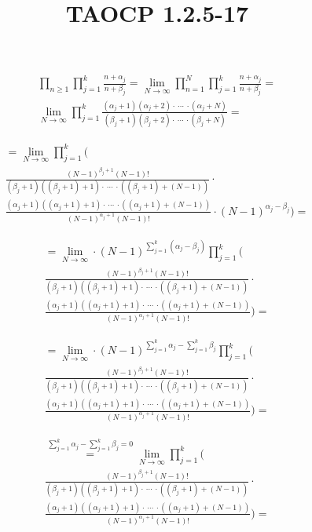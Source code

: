 \documentclass{article}
\title{TAOCP 1.2.5\mbox{-}17}
\begin{document}
\maketitle

\begin{multline*}
\prod_{n \geq 1}\prod_{j=1}^{k} \frac{n + \alpha_{j}}{n + \beta_{j}} = \lim_{N\to\infty}\prod_{n=1}^{N}\prod_{j=1}^{k} \frac{n + \alpha_{j}}{n + \beta_{j}} = \\
\lim_{N\to\infty}\prod_{j=1}^{k}\frac{(\alpha_{j} + 1)(\alpha_{j} + 2) \cdot\ \cdots\ \cdot (\alpha_{j} + N)}{(\beta_{j} + 1)(\beta_{j} + 2) \cdot\ \cdots\ \cdot (\beta_{j} + N)} =
\end{multline*}

\begin{multline*}
= \lim_{N\to\infty}\prod_{j=1}^{k}( \\
\frac{{(N-1)}^{\beta_{j}+1}(N-1)!}{(\beta_{j} + 1)((\beta_{j} + 1) + 1) \cdot\ \cdots\ \cdot ((\beta_{j} + 1) + (N-1))} \cdot \\
\frac{(\alpha_{j} + 1)((\alpha_{j} + 1) + 1) \cdot\ \cdots\ \cdot ((\alpha_{j} + 1) + (N-1))}{{(N-1)}^{\alpha_{j}+1}(N-1)!} \cdot {(N-1)}^{\alpha_{j}-\beta_{j}}) =
\end{multline*}

\begin{multline*}
= \lim_{N\to\infty} \cdot {(N-1)}^{\sum_{j=1}^k{(\alpha_{j}-\beta_{j})}} \prod_{j=1}^{k}( \\
\frac{{(N-1)}^{\beta_{j}+1}(N-1)!}{(\beta_{j} + 1)((\beta_{j} + 1) + 1) \cdot\ \cdots\ \cdot ((\beta_{j} + 1) + (N-1))} \cdot \\
\frac{(\alpha_{j} + 1)((\alpha_{j} + 1) + 1) \cdot\ \cdots\ \cdot ((\alpha_{j} + 1) + (N-1))}{{(N-1)}^{\alpha_{j}+1}(N-1)!}) =
\end{multline*}

\begin{multline*}
= \lim_{N\to\infty} \cdot {(N-1)}^{\sum_{j=1}^k{\alpha_{j}}-\sum_{j=1}^k{\beta_{j}}} \prod_{j=1}^{k}( \\
\frac{{(N-1)}^{\beta_{j}+1}(N-1)!}{(\beta_{j} + 1)((\beta_{j} + 1) + 1) \cdot\ \cdots\ \cdot ((\beta_{j} + 1) + (N-1))} \cdot \\
\frac{(\alpha_{j} + 1)((\alpha_{j} + 1) + 1) \cdot\ \cdots\ \cdot ((\alpha_{j} + 1) + (N-1))}{{(N-1)}^{\alpha_{j}+1}(N-1)!}) =
\end{multline*}

\begin{multline*}
\overset{\sum_{j=1}^k{\alpha_{j}}-\sum_{j=1}^k{\beta_{j}} = 0}{=} \lim_{N\to\infty} \prod_{j=1}^{k}( \\
\frac{{(N-1)}^{\beta_{j}+1}(N-1)!}{(\beta_{j} + 1)((\beta_{j} + 1) + 1) \cdot\ \cdots\ \cdot ((\beta_{j} + 1) + (N-1))} \cdot \\
\frac{(\alpha_{j} + 1)((\alpha_{j} + 1) + 1) \cdot\ \cdots\ \cdot ((\alpha_{j} + 1) + (N-1))}{{(N-1)}^{\alpha_{j}+1}(N-1)!}) =
\end{multline*}
\end{document}
